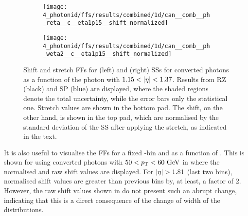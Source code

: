 \begin{figure}[ht!]
    \centering
    \begin{subfigure}[h]{0.49\linewidth}
        \centering
        \texttt{[image: 4\_photonid/ffs/results/combined/1d/can\_\_comb\_\_ph\_reta\_\_c\_\_eta1p15\_\_shift\_normalized]}
        \caption{\reta}
        \label{fig:ss_corrections:ffs:reslts:ffs:reta}
    \end{subfigure}
    \hfill
    \begin{subfigure}[h]{0.49\linewidth}
        \centering
        \texttt{[image: 4\_photonid/ffs/results/combined/1d/can\_\_comb\_\_ph\_weta2\_\_c\_\_eta1p15\_\_shift\_normalized]}
        \caption{\weta}
        \label{fig:ss_corrections:ffs:reslts:ffs:weta}
    \end{subfigure}
    \caption{Shift and stretch \acp{FF} for \reta (left) and \weta (right) \acp{SS} for converted photons as a function of the photon \pt with \(1.15<\abseta<1.37\). Results from \ac{RZ} (black) and \ac{SP} (blue) are displayed, where the shaded regions denote the total uncertainty, while the error bars only the statistical one. Stretch values are shown in the bottom pad. The shift, on the other hand, is shown in the top pad, which are normalised by the standard deviation of the \ac{SS} after applying the stretch, as indicated in the text.}
    \label{fig:ss_corrections:ffs:reslts:ffs}
\end{figure}

It is also useful to visualise the \acp{FF} for a fixed \pt-bin and as a function of \abseta. This is shown for \wstot using converted photons with \(50<p_{\text{T}}<60~\text{GeV}\) in \Fig{\ref{fig:ss_corrections:ffs:reslts:ffs_eta_wstot}} where the normalised and raw shift values are displayed. For \(\abseta>1.81\) (last two bins), normalised shift values are greater than previous bins by, at least, a factor of 2. However, the raw shift values shown in \Fig{\ref{fig:ss_corrections:ffs:reslts:ffs_eta_wstot:raw_shift}} do not present such an abrupt change, indicating that this is a direct consequence of the change of width of the distributions.


